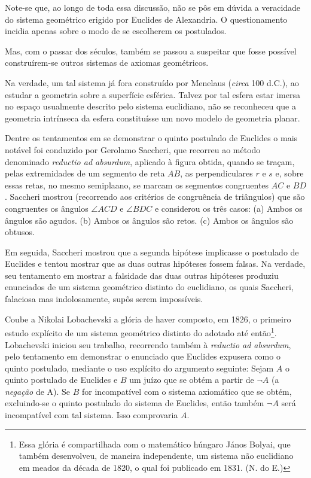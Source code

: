 \documentclass{hipatia}
\begin{document}
Note-se que, ao longo de toda essa discussão, não se pôs em dúvida a veracidade do sistema geométrico erigido por Euclides de Alexandria. O questionamento incidia apenas sobre o modo de se escolherem os postulados. 

Mas, com o passar dos séculos, também se passou a suspeitar que fosse possível construírem-se outros sistemas de axiomas geométricos. 

Na verdade, um tal sistema já fora construído por Menelaus (\emph{circa} 100 d.C.), ao estudar a geometria sobre a superfície esférica. Talvez por tal esfera estar imersa no espaço usualmente descrito pelo sistema euclidiano, não se reconheceu que a geometria intrínseca da esfera constituísse um novo modelo de geometria planar.  \cite[p. 57]{struik1987} 

Dentre os tentamentos em se demonstrar o quinto postulado de Euclides o mais notável foi conduzido por Gerolamo Saccheri, que recorreu ao método denominado \emph{reductio ad absurdum}, aplicado à figura obtida, quando se traçam, pelas extremidades de um segmento de reta $AB$, as perpendiculares $r$ e $s$ e, sobre essas retas, no mesmo semiplaano, se marcam os segmentos congruentes $AC$ e $BD$. Saccheri mostrou (recorrendo aos critérios de congruência de triângulos) que são congruentes os ângulos $\angle ACD$ e $\angle BDC$ e considerou os três casos: 
(a)  Ambos os ângulos são agudos. 
(b)  Ambos os ângulos são retos. 
(c)  Ambos os ângulos são obtusos.

Em seguida, Saccheri mostrou que a segunda hipótese implicasse o postulado de Euclides e tentou mostrar que as duas outras hipóteses fossem falsas. Na verdade, seu tentamento em mostrar a falsidade das duas outras hipóteses produziu enunciados de um sistema geométrico distinto do euclidiano, os quais Saccheri, falaciosa mas indolosamente, supôs serem impossíveis.  \cite[p. 182]{kneebone1963}

Coube a Nikolai Lobachevski a glória de haver composto, em 1826, o primeiro estudo explícito de um sistema geométrico distinto do adotado até então\footnote{
Essa glória é compartilhada com o matemático húngaro
János Bolyai, que também desenvolveu, de maneira independente, um sistema não euclidiano em meados da década de 1820, o qual foi publicado em 1831.  
(N. do E.)}. Lobachevski iniciou seu trabalho, recorrendo também à \emph{reductio ad absurdum}, pelo tentamento em demonstrar o enunciado que Euclides expusera como o quinto postulado, mediante o uso explícito do argumento seguinte: Sejam $A$ o quinto postulado de Euclides e $B$ um juízo que se obtém a partir de $\neg A$  (a \emph{negação} de A). Se $B$ for incompatível com o sistema axiomático que se obtém, excluindo-se o quinto postulado do sistema de Euclides, então também $\neg A$ será incompatível com tal sistema. Isso comprovaria $A$.   \cite[p. 29]{bachelard1934}\cite[p. 388]{kneale}\cite[p. 13--14]{smogorzhevski1976}      
\end{document}
